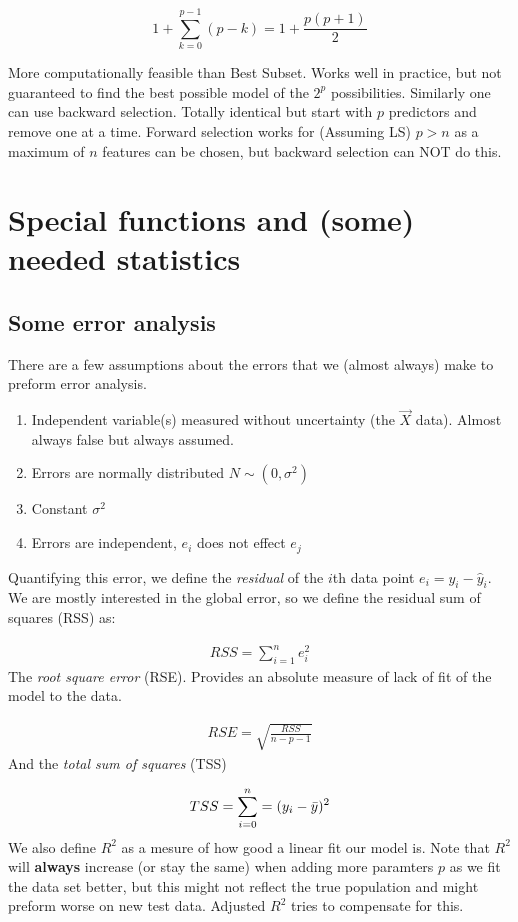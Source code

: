 \documentclass{article}
\begin{document}
\begin{equation*}
    1 + \sum_{k=0}^{p-1} (p-k) = 1 + \frac{p(p+1)}{2} 
\end{equation*}

More computationally feasible than Best Subset. Works well in practice, but not guaranteed to find the best possible model of the $2^p$ possibilities. Similarly one can use backward selection. Totally identical but start with $p$ predictors and remove one at a time. Forward selection works for (Assuming LS) $p > n$ as a maximum of $n$ features can be chosen, but backward selection can NOT do this.

\section{Special functions and (some) needed statistics}
\subsection{Some error analysis}
There are a few assumptions about the errors that we (almost always) make to preform error analysis.

\begin{enumerate}
    \item Independent variable(s) measured without uncertainty (the $\Vec{X}$ data). Almost always false but always assumed.
    \item Errors are normally distributed $N\sim(0,\sigma^2)$
    \item Constant $\sigma^2$ 
    \item Errors are independent, $e_i$ does not effect $e_j$ 
\end{enumerate}
Quantifying this error, we define the \textit{residual} of the $i$th data point $e_i = y_i-\hat{y}_i$. We are mostly interested in the global error, so we define the residual sum of squares (RSS) as:

\begin{align*}
    RSS = \sum_{i=1}^{n} e_i^2
\end{align*}
The \textit{root square error} (RSE). Provides an absolute measure of lack of fit of the model to the data.

\begin{align*}
    RSE = \sqrt{\frac{RSS}{n-p-1}}
\end{align*}
And the \textit{total sum of squares} (TSS)

\begin{align*}
    TSS = \sum_{i=0}^{n} = (y_i - \Bar{y})^2
\end{align*}
We also define $R^2$ as a mesure of how good a linear fit our model is. Note that $R^2$ will \textbf{always} increase (or stay the same) when adding more paramters $p$ as we fit the data set better, but this might not reflect the true population and might preform worse on new test data. Adjusted $R^2$ tries to compensate for this.
\end{document}
